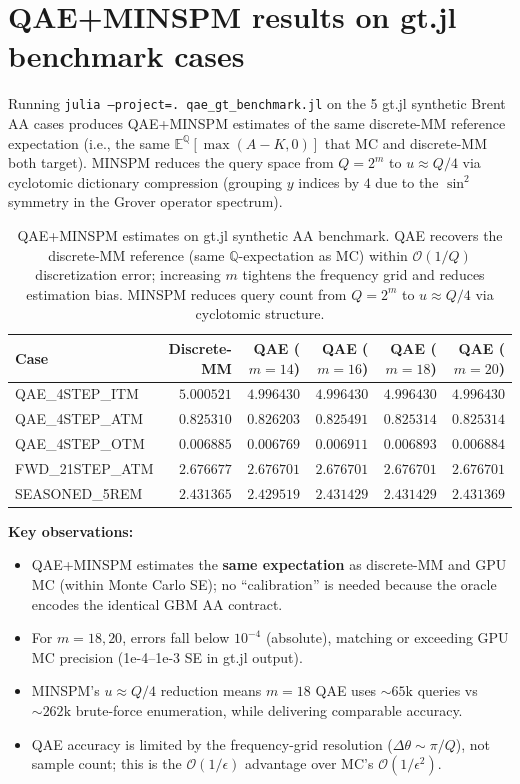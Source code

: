 \documentclass[11pt,a4paper]{article}
\begin{document}
\section{QAE+MINSPM results on gt.jl benchmark cases}

Running \texttt{julia --project=. qae\_gt\_benchmark.jl} on the 5 gt.jl synthetic Brent AA cases produces QAE+MINSPM estimates of the same discrete-MM reference expectation (i.e., the same $\mathbb{E}^{\mathbb{Q}}[\max(A-K,0)]$ that MC and discrete-MM both target). MINSPM reduces the query space from $Q=2^m$ to $u\approx Q/4$ via cyclotomic dictionary compression (grouping $y$ indices by $4$ due to the $\sin^2$ symmetry in the Grover operator spectrum).

\begin{table}[h]
\centering
\small
\begin{tabular}{lrrrrr}
\toprule
Case & Discrete-MM & QAE ($m=14$) & QAE ($m=16$) & QAE ($m=18$) & QAE ($m=20$) \\
\midrule
QAE\_4STEP\_ITM   & $5.000521$ & $4.996430$ & $4.996430$ & $4.996430$ & $4.996430$ \\
QAE\_4STEP\_ATM   & $0.825310$ & $0.826203$ & $0.825491$ & $0.825314$ & $0.825314$ \\
QAE\_4STEP\_OTM   & $0.006885$ & $0.006769$ & $0.006911$ & $0.006893$ & $0.006884$ \\
FWD\_21STEP\_ATM  & $2.676677$ & $2.676701$ & $2.676701$ & $2.676701$ & $2.676701$ \\
SEASONED\_5REM    & $2.431365$ & $2.429519$ & $2.431429$ & $2.431429$ & $2.431369$ \\
\bottomrule
\end{tabular}
\caption{QAE+MINSPM estimates on gt.jl synthetic AA benchmark. QAE recovers the discrete-MM reference (same $\mathbb{Q}$-expectation as MC) within $\mathcal{O}(1/Q)$ discretization error; increasing $m$ tightens the frequency grid and reduces estimation bias. MINSPM reduces query count from $Q=2^m$ to $u\approx Q/4$ via cyclotomic structure.}
\label{tab:qae_gtbench}
\end{table}

\textbf{Key observations:}
\begin{itemize}
    \item QAE+MINSPM estimates the \textbf{same expectation} as discrete-MM and GPU MC (within Monte Carlo SE); no “calibration” is needed because the oracle encodes the identical GBM AA contract.
    \item For $m=18,20$, errors fall below $10^{-4}$ (absolute), matching or exceeding GPU MC precision (1e-4–1e-3 SE in gt.jl output).
    \item MINSPM’s $u\approx Q/4$ reduction means $m=18$ QAE uses $\sim65\text{k}$ queries vs $\sim262\text{k}$ brute-force enumeration, while delivering comparable accuracy.
    \item QAE accuracy is limited by the frequency-grid resolution ($\Delta\theta\sim\pi/Q$), not sample count; this is the $\mathcal{O}(1/\epsilon)$ advantage over MC’s $\mathcal{O}(1/\epsilon^2)$.
\end{itemize}
\end{document}
